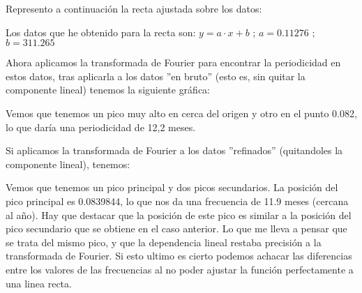 \documentclass[12pt,thmsa]{article}
\begin{document}
\vspace{1pt}

Represento a continuaci\'{o}n la recta ajustada sobre los datos:

\vspace{1pt}

Los datos que he obtenido para la recta son: $y=a\cdot x+b$ ; $a=0.11276$ ; $%
b=311.265$

\vspace{1pt}

Ahora aplicamos la transformada de Fourier para encontrar la periodicidad en
estos datos, tras aplicarla a los datos ''en bruto'' (esto es, sin quitar la
componente lineal) tenemos la siguiente gr\'{a}fica:


Vemos que tenemos un pico muy alto en cerca del origen y otro en el punto
0.082, lo que dar\'{i}a una periodicidad de 12,2 meses.

\vspace{1pt}

Si aplicamos la transformada de Fourier a los datos ''refinados''
(quitandoles la componente lineal), tenemos:


Vemos que tenemos un pico principal y dos picos secundarios. La posici\'{o}n
del pico principal es 0.0839844, lo que nos da una frecuencia de 11.9 meses
(cercana al a\~{n}o). Hay que destacar que la posici\'{o}n de este pico es
similar a la posici\'{o}n del pico secundario que se obtiene en el caso
anterior. Lo que me lleva a pensar que se trata del mismo pico, y que la
dependencia lineal restaba precisi\'{o}n a la transformada de Fourier. Si
esto ultimo es cierto podemos achacar las diferencias entre los valores de
las frecuencias al no poder ajustar la funci\'{o}n perfectamente a una linea
recta.
\end{document}
